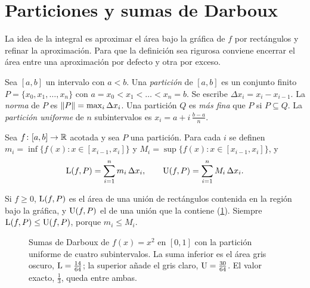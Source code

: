 \section{Particiones y sumas de Darboux}

La idea de la integral es aproximar el área bajo la gráfica de $f$ por rectángulos y refinar la aproximación. Para que la definición sea rigurosa conviene encerrar el área entre una aproximación por defecto y otra por exceso.

\begin{definicion}[Partición]\label{def:particion}
Sea $[a,b]$ un intervalo con $a<b$. Una \emph{partición} de $[a,b]$ es un conjunto finito $P=\{x_0,x_1,\dots,x_n\}$ con $a=x_0<x_1<\dots<x_n=b$. Se escribe $\Delta x_i=x_i-x_{i-1}$. La \emph{norma} de $P$ es $\lVert P\rVert=\max_i\Delta x_i$. Una partición $Q$ es \emph{más fina} que $P$ si $P\subseteq Q$. La \emph{partición uniforme} de $n$ subintervalos es $x_i=a+i\,\frac{b-a}{n}$.
\end{definicion}

\begin{definicion}\label{def:sumas}
Sea $f\colon[a,b]\to\mathbb{R}$ acotada y sea $P$ una partición. Para cada $i$ se definen
$m_i=\inf\{f(x):x\in[x_{i-1},x_i]\}$ y $M_i=\sup\{f(x):x\in[x_{i-1},x_i]\}$, y
\[
\operatorname{L}(f,P)=\sum_{i=1}^{n}m_i\,\Delta x_i,\qquad \operatorname{U}(f,P)=\sum_{i=1}^{n}M_i\,\Delta x_i .
\]
\end{definicion}

Si $f\ge0$, $\operatorname{L}(f,P)$ es el área de una unión de rectángulos contenida en la región bajo la gráfica, y $\operatorname{U}(f,P)$ el de una unión que la contiene (\cref{fig:darboux}). Siempre $\operatorname{L}(f,P)\le\operatorname{U}(f,P)$, porque $m_i\le M_i$.

\begin{figure}[h]
\centering
{}
\caption{Sumas de Darboux de $f(x)=x^{2}$ en $[0,1]$ con la partición uniforme de cuatro subintervalos. La suma inferior es el área gris oscuro, $\operatorname{L}=\frac{14}{64}$; la superior añade el gris claro, $\operatorname{U}=\frac{30}{64}$. El valor exacto, $\frac13$, queda entre ambas.}
\label{fig:darboux}
\end{figure}

